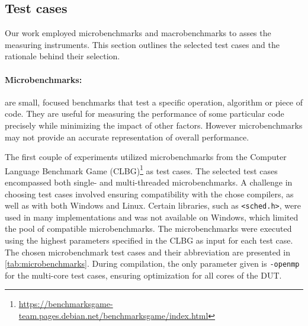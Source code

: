 \subsection{Test cases}\label{subsec:test_cases}

Our work employed microbenchmarks and macrobenchmarks to asses the measuring instruments. This section outlines the selected test cases and the rationale behind their selection.

\paragraph{Microbenchmarks:} are small, focused benchmarks that test a specific operation, algorithm or piece of code. They are useful for measuring the performance of some particular code precisely while minimizing the impact of other factors. However microbenchmarks may not provide an accurate representation of overall performance.\cite{MicroVSMacro}

The first couple of experiments utilized microbenchmarks from the Computer Language Benchmark Game (CLBG)\footnote{\url{https://benchmarksgame-team.pages.debian.net/benchmarksgame/index.html}} as test cases. The selected test cases encompassed both single- and multi-threaded microbenchmarks. A challenge in choosing test cases involved ensuring compatibility with the chose compilers, as well as with both Windows and Linux. Certain libraries, such as \texttt{<sched.h>}, were used in many implementations and was not available on Windows, which limited the pool of compatible microbenchmarks. The microbenchmarks were executed using the highest parameters specified in the CLBG as input for each test case. The chosen microbenchmark test cases and their abbreviation are presented in \cref{tab:microbenchmarks}. During compilation, the only parameter given is \texttt{-openmp} for the multi-core test cases, ensuring optimization for all cores of the DUT.



